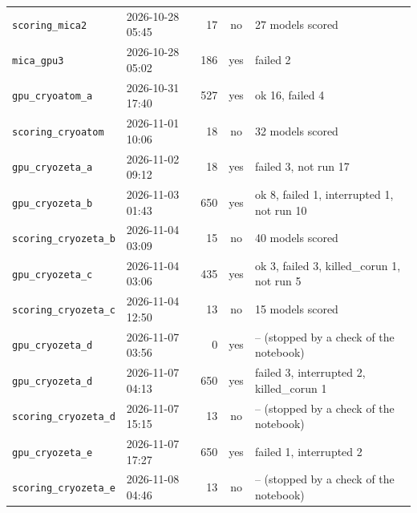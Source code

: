 \begin{tabular}{llrcl}
\texttt{scoring\_mica2} & 2026-10-28 05:45 & 17 & no & 27 models scored \\
\texttt{mica\_gpu3} & 2026-10-28 05:02 & 186 & yes & failed 2 \\
\texttt{gpu\_cryoatom\_a} & 2026-10-31 17:40 & 527 & yes & ok 16, failed 4 \\
\texttt{scoring\_cryoatom} & 2026-11-01 10:06 & 18 & no & 32 models scored \\
\texttt{gpu\_cryozeta\_a} & 2026-11-02 09:12 & 18 & yes & failed 3, not run 17 \\
\texttt{gpu\_cryozeta\_b} & 2026-11-03 01:43 & 650 & yes & ok 8, failed 1, interrupted 1, not run 10 \\
\texttt{scoring\_cryozeta\_b} & 2026-11-04 03:09 & 15 & no & 40 models scored \\
\texttt{gpu\_cryozeta\_c} & 2026-11-04 03:06 & 435 & yes & ok 3, failed 3, killed\_corun 1, not run 5 \\
\texttt{scoring\_cryozeta\_c} & 2026-11-04 12:50 & 13 & no & 15 models scored \\
\texttt{gpu\_cryozeta\_d} & 2026-11-07 03:56 & 0 & yes & -- (stopped by a check of the notebook) \\
\texttt{gpu\_cryozeta\_d} & 2026-11-07 04:13 & 650 & yes & failed 3, interrupted 2, killed\_corun 1 \\
\texttt{scoring\_cryozeta\_d} & 2026-11-07 15:15 & 13 & no & -- (stopped by a check of the notebook) \\
\texttt{gpu\_cryozeta\_e} & 2026-11-07 17:27 & 650 & yes & failed 1, interrupted 2 \\
\texttt{scoring\_cryozeta\_e} & 2026-11-08 04:46 & 13 & no & -- (stopped by a check of the notebook) \\
\bottomrule
\end{tabular}
